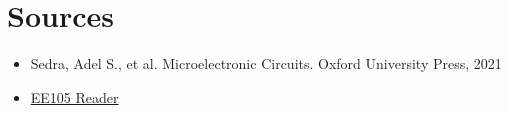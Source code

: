 \section{Sources}
\begin{itemize}
    \item Sedra, Adel S., et al. Microelectronic Circuits. Oxford University Press, 2021
    \item \href{https://file.notion.so/f/f/048d6522-202b-48d4-b5d9-bc005bd602e2/214bf1f0-292f-48d6-9016-737d9f5da155/ee105_reader_v3.pdf?id=237a4300-3dbe-47d1-888b-ffae90d8352b&table=block&spaceId=048d6522-202b-48d4-b5d9-bc005bd602e2&expirationTimestamp=1714435200000&signature=yx-H1qvZJIodPfazOpwXX0Ce2mWMG8skOHl45xoPxus&downloadName=ee105_reader_v3.pdf}{EE105 Reader}
\end{itemize}